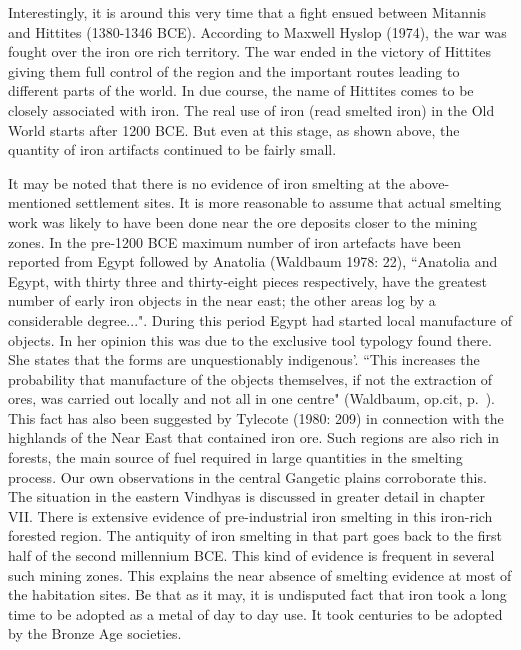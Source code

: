 {Interestingly, it is around this very time that a fight ensued between Mitannis and Hittites (1380-1346 BCE). According to Maxwell Hyslop (1974), the war was fought over the iron ore rich territory. The war ended in the victory of Hittites giving them full control of the region and the important routes leading to different parts of the world. In due course, the name of Hittites comes to be closely associated with iron. The real use of iron (read smelted iron) in the Old World starts after 1200 BCE. But even at this stage, as shown above, the quantity of iron artifacts continued to be fairly small. 

It may be noted that there is no evidence of iron smelting at the above-mentioned settlement sites. It is more reasonable to assume that actual smelting work was likely to have been done near the ore deposits closer to the mining zones. In the pre-1200 BCE maximum number of iron artefacts have been reported from Egypt followed by Anatolia (Waldbaum 1978: 22), {\footnotesize ``Anatolia and Egypt, with thirty three and thirty-eight pieces respectively, have the greatest number of early iron objects in the near east; the other areas log by a considerable degree...".} During this period Egypt had started local manufacture of objects. In her opinion this was due to the exclusive tool typology found there. She states that the forms are unquestionably indigenous'. ``This increases the probability that manufacture of the objects themselves, if not the extraction of ores, was carried out locally and not all in one centre" (Waldbaum, op.cit, p.~\pageref{pageno23}). This fact has also been suggested by Tylecote (1980: 209) in connection with the highlands of the Near East that contained iron ore. Such regions are also rich in forests, the main source of fuel required in large quantities in the smelting process. Our own observations in the central Gangetic plains corroborate this. The situation in the eastern Vindhyas is discussed in greater detail in chapter VII. There is extensive evidence of pre-industrial iron smelting in this iron-rich forested region. The antiquity of iron smelting in that part goes back to the first half of the second millennium BCE. This kind of evidence is frequent in several such mining zones. This explains the near absence of smelting evidence at most of the habitation sites. Be that as it may, it is undisputed fact that iron took a long time to be adopted as a metal of day to day use. It took centuries to be adopted by the Bronze Age societies. 

}
